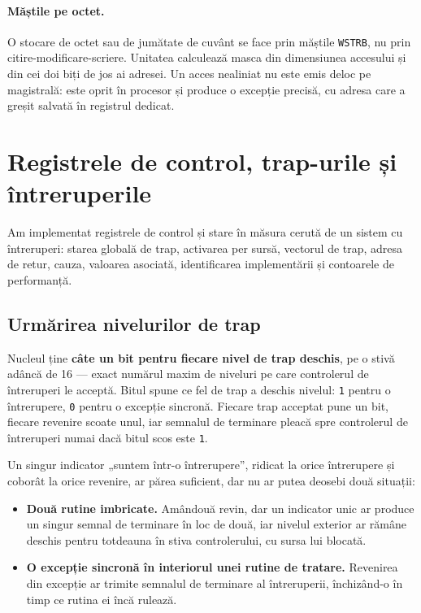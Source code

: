 \documentclass[11pt,openany]{report}
\newcommand{\sig}[1]{\texttt{#1}}
\begin{document}
\paragraph{Măștile pe octet.} O stocare de octet sau de jumătate de cuvânt se
face prin măștile \sig{WSTRB}, nu prin citire-modificare-scriere. Unitatea
calculează masca din dimensiunea accesului și din cei doi biți de jos ai
adresei. Un acces nealiniat nu este emis deloc pe magistrală: este oprit în
procesor și produce o excepție precisă, cu adresa care a greșit salvată în
registrul dedicat.

\section{Registrele de control, trap-urile și întreruperile}

Am implementat registrele de control și stare în măsura cerută de un sistem cu
întreruperi: starea globală de trap, activarea per sursă, vectorul de trap,
adresa de retur, cauza, valoarea asociată, identificarea implementării și
contoarele de performanță.

\subsection{Urmărirea nivelurilor de trap}

Nucleul ține \textbf{câte un bit pentru fiecare nivel de trap deschis}, pe o
stivă adâncă de 16 --- exact numărul maxim de niveluri pe care controlerul de
întreruperi le acceptă. Bitul spune ce fel de trap a deschis nivelul:
\texttt{1} pentru o întrerupere, \texttt{0} pentru o excepție sincronă. Fiecare
trap acceptat pune un bit, fiecare revenire scoate unul, iar semnalul de
terminare pleacă spre controlerul de întreruperi numai dacă bitul scos este
\texttt{1}.

Un singur indicator „suntem într-o întrerupere”, ridicat la orice întrerupere și
coborât la orice revenire, ar părea suficient, dar nu ar putea deosebi două
situații:

\begin{itemize}[itemsep=3pt,topsep=3pt]
\item \textbf{Două rutine imbricate.} Amândouă revin, dar un indicator unic ar
      produce un singur semnal de terminare în loc de două, iar nivelul exterior
      ar rămâne deschis pentru totdeauna în stiva controlerului, cu sursa lui
      blocată.
\item \textbf{O excepție sincronă în interiorul unei rutine de tratare.}
      Revenirea din excepție ar trimite semnalul de terminare al întreruperii,
      închizând-o în timp ce rutina ei încă rulează.
\end{itemize}
\end{document}
